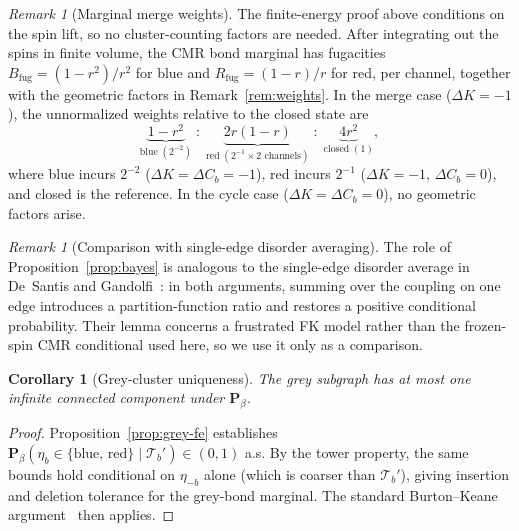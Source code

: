 \documentclass[11pt]{article}
\newtheorem{corollary}[theorem]{Corollary}
\numberwithin{theorem}{section}
\theoremstyle{remark}
\newtheorem{remark}[theorem]{Remark}
\begin{document}
\begin{remark}[Marginal merge weights]\label{rem:merge-weights}
The finite-energy proof above conditions on the spin lift, so no cluster-counting factors are needed.
After integrating out the spins in finite volume, the CMR bond marginal has fugacities $B_{\mathrm{fug}} = (1-r^2)/r^2$ for blue and $R_{\mathrm{fug}} = (1-r)/r$ for red, per channel, together with the geometric factors in Remark~\ref{rem:weights}.
In the merge case ($\Delta K=-1$), the unnormalized weights relative to the closed state are
\begin{equation}\label{eq:merge-weights}
  \underbrace{1-r^2}_{\text{blue}\;(2^{-2})} \;:\; \underbrace{2r(1-r)}_{\text{red}\;(2^{-1} \times 2\text{ channels})} \;:\; \underbrace{4r^2}_{\text{closed}\;(1)},
\end{equation}
where blue incurs $2^{-2}$ ($\Delta K=\Delta C_b=-1$), red incurs $2^{-1}$ ($\Delta K=-1$, $\Delta C_b=0$), and closed is the reference.
In the cycle case ($\Delta K=\Delta C_b=0$), no geometric factors arise.
\end{remark}

\begin{remark}[Comparison with single-edge disorder averaging]\label{rem:single-bond}
The role of Proposition~\ref{prop:bayes} is analogous to the single-edge disorder average in De~Santis and Gandolfi~\cite[Lemma~3.1]{DSG1999}: in both arguments, summing over the coupling on one edge introduces a partition-function ratio and restores a positive conditional probability. Their lemma concerns a frustrated FK model rather than the frozen-spin CMR conditional used here, so we use it only as a comparison.
\end{remark}

\begin{corollary}[Grey-cluster uniqueness]\label{cor:grey-unique}
The grey subgraph has at most one infinite connected component under $\mathbf{P}_\beta$.
\end{corollary}

\begin{proof}
Proposition~\ref{prop:grey-fe} establishes $\mathbf{P}_\beta(\eta_b \in \{\text{blue, red}\} \mid \mathcal{T}_b') \in (0,1)$ a.s.
By the tower property, the same bounds hold conditional on $\eta_{-b}$ alone (which is coarser than $\mathcal{T}_b'$), giving insertion and deletion tolerance for the grey-bond marginal.
The standard Burton--Keane argument~\cite{BK1989,GKN1992} then applies.
\end{proof}
\end{document}
